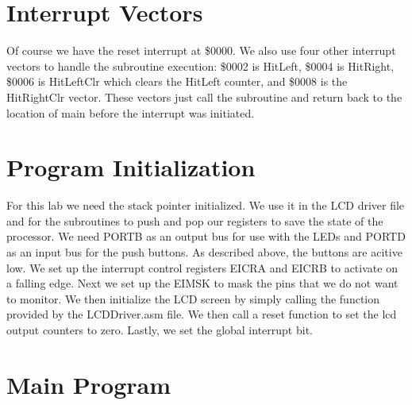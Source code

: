 \documentclass[12pt, letterpaper]{article}
\begin{document}
\section{Interrupt Vectors}

Of course we have the reset interrupt at \$0000. We also use four other interrupt vectors to handle the subroutine execution: \$0002 is HitLeft, \$0004 is HitRight, \$0006 is HitLeftClr which clears the HitLeft counter, and \$0008 is the HitRightClr vector. These vectors just call the subroutine and return back to the location of main before the interrupt was initiated.


\section{Program Initialization}

For this lab we need the stack pointer initialized. We use it in the LCD driver file and for the subroutines to push and pop our registers to save the state of the processor. We need PORTB as an output bus for use with the LEDs and PORTD as an input bus for the push buttons. As described above, the buttons are acitive low. We set up the interrupt control registers EICRA and EICRB to activate on a falling edge. Next we set up the EIMSK to mask the pins that we do not want to monitor. We then initialize the LCD screen by simply calling the function provided by the LCDDriver.asm file. We then call a reset function to set the lcd output counters to zero. Lastly, we set the global interrupt bit.



\section{Main Program}
\end{document}
